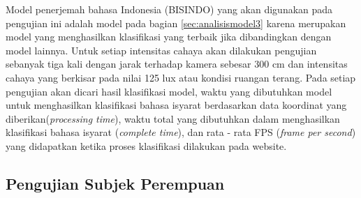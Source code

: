 Model penerjemah bahasa Indonesia (BISINDO) yang akan digunakan pada pengujian ini adalah model pada bagian \ref{sec:analisismodel3} karena merupakan model yang menghasilkan klasifikasi yang terbaik jika dibandingkan dengan model lainnya. Untuk setiap intensitas cahaya akan dilakukan pengujian sebanyak tiga kali dengan jarak terhadap kamera sebesar 300 cm dan intensitas cahaya yang berkisar pada nilai 125 lux atau kondisi ruangan terang. Pada setiap pengujian akan dicari hasil klasifikasi model, waktu yang dibutuhkan model untuk menghasilkan klasifikasi bahasa isyarat berdasarkan data koordinat yang diberikan(\emph{processing time}), waktu total yang dibutuhkan dalam menghasilkan klasifikasi bahasa isyarat (\emph{complete time}), dan rata - rata FPS (\emph{frame per second}) yang didapatkan ketika proses klasifikasi dilakukan pada website.  

\subsection{Pengujian Subjek Perempuan}
\label{sec:analisisperempuan}

